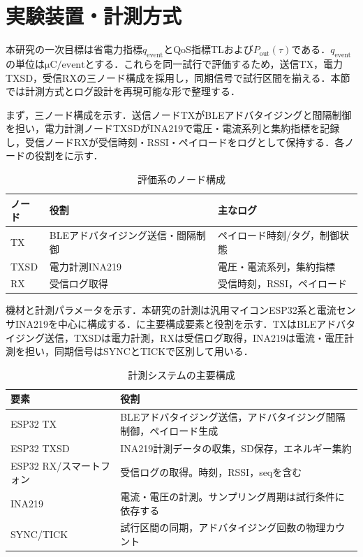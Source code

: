 ﻿%
\section{実験装置・計測方式}
\label{sec:measurement_setup}

本研究の一次目標は省電力指標$q_{\mathrm{event}}$とQoS指標TLおよび$P_{\mathrm{out}}(\tau)$である．$q_{\mathrm{event}}$の単位は$\si{\micro\coulomb}/\text{event}$とする．これらを同一試行で評価するため，送信TX，電力TXSD，受信RXの三ノード構成を採用し，同期信号で試行区間を揃える．本節では計測方式とログ設計を再現可能な形で整理する．

まず，三ノード構成を示す．送信ノードTXがBLEアドバタイジングと間隔制御を担い，電力計測ノードTXSDがINA219で電圧・電流系列と集約指標を記録し，受信ノードRXが受信時刻・RSSI・ペイロードをログとして保持する．各ノードの役割をに示す．

\begin{table}[tb]
  \centering
  \caption{評価系のノード構成}
  \label{tab:nodes}
  \begin{tabular}{lll}
    \toprule
    ノード & 役割 & 主なログ \\
    \midrule
    TX & BLEアドバタイジング送信・間隔制御 & ペイロード時刻/タグ，制御状態 \\
    TXSD & 電力計測INA219 & 電圧・電流系列，集約指標 \\
    RX & 受信ログ取得 & 受信時刻，RSSI，ペイロード \\
    \bottomrule
  \end{tabular}
\end{table}
機材と計測パラメータを示す．本研究の計測は汎用マイコンESP32系と電流センサINA219を中心に構成する．に主要構成要素と役割を示す．TXはBLEアドバタイジング送信，TXSDは電力計測，RXは受信ログ取得，INA219は電流・電圧計測を担い，同期信号はSYNCとTICKで区別して用いる．

\begin{table}[tb]
  \centering
  \caption{計測システムの主要構成}
  \label{tab:hw}
  \begin{tabularx}{\linewidth}{l>{\raggedright\arraybackslash}X}
    \toprule
    要素 & 役割 \\
    \midrule
    ESP32 TX & BLEアドバタイジング送信，アドバタイジング間隔制御，ペイロード生成 \\
    ESP32 TXSD & INA219計測データの収集，SD保存，エネルギー集約 \\
    ESP32 RX/スマートフォン & 受信ログの取得。時刻，RSSI，seqを含む \\
    INA219 & 電流・電圧の計測。サンプリング周期は試行条件に依存する \\
    SYNC/TICK & 試行区間の同期，アドバタイジング回数の物理カウント \\
    \bottomrule
  \end{tabularx}
\end{table}

